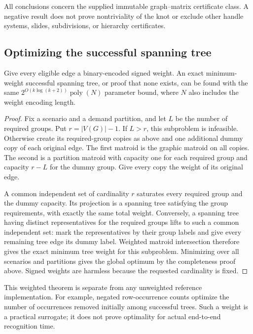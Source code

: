 All conclusions concern the supplied immutable graph--matrix
certificate class. A negative result does not prove nontriviality of
the knot or exclude other handle systems, slides, subdivisions, or
hierarchy certificates.

\subsection{Optimizing the successful spanning tree}

\begin{theorem}
\label{thm:fpt-minimum-weight-tree}
Give every eligible edge a binary-encoded signed weight. An exact
minimum-weight successful spanning tree, or proof that none exists,
can be found with the same
$2^{O(k\log(k+2))}\operatorname{poly}(N)$ parameter bound, where $N$
also includes the weight encoding length.
\end{theorem}
\begin{proof}
Fix a scenario and a demand partition, and let $L$ be the number of
required groups. Put $r=|V(G)|-1$. If $L>r$, this subproblem is
infeasible. Otherwise create its required-group copies as above and one
additional dummy copy of each original edge. The first matroid is the
graphic matroid on all copies. The second is a partition matroid with
capacity one for each required group and capacity $r-L$ for the dummy
group. Give every copy the weight of its original edge.

A common independent set of cardinality $r$ saturates every required
group and the dummy capacity. Its projection is a spanning tree
satisfying the group requirements, with exactly the same total weight.
Conversely, a spanning tree having distinct representatives for the
required groups lifts to such a common independent set: mark the
representatives by their group labels and give every remaining tree edge
its dummy label. Weighted matroid intersection therefore gives the exact
minimum tree weight for this subproblem. Minimizing over all scenarios
and partitions gives the global optimum by the completeness proof above.
Signed weights are harmless because the requested cardinality is fixed.
\end{proof}

This weighted theorem is separate from any unweighted reference
implementation. For example, negated row-occurrence counts optimize the
number of occurrences removed initially among successful trees. Such a
weight is a practical surrogate; it does not prove optimality for actual
end-to-end recognition time.

